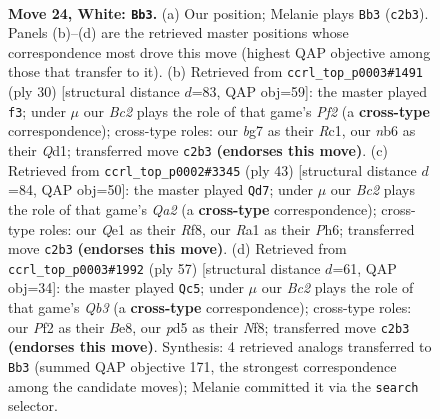\documentclass[11pt]{article}
\begin{document}
\clearpage

\begin{figure}[p]\centering
\begin{subfigure}{0.46\textwidth}\centering
\resizebox{\linewidth}{!}{%
\newchessgame
\chessboard[
  setfen={2r3k1/pp3pb1/1nn2qp1/3p3p/3P4/6BP/PPB2PP1/RN2Q1K1 w - - 1 24},
  showmover=false,
  pgfstyle=straightmove, color=movearrow, markmove={c2-b3}
]}
\caption{}
\end{subfigure}\hfill
\begin{subfigure}{0.46\textwidth}\centering
\resizebox{\linewidth}{!}{%
\newchessgame
\chessboard[
  setfen={r3q1k1/1p3pp1/p1n2n1p/3p1b2/3P1B2/2N3P1/PP3PBP/2RQ2K1 w - - 0 16},
  showmover=false,
  pgfstyle=straightmove, color=movearrow, markmove={f2-f3}
]}
\caption{}
\end{subfigure}
\\[4pt]
\begin{subfigure}{0.46\textwidth}\centering
\resizebox{\linewidth}{!}{%
\newchessgame
\chessboard[
  setfen={1n3rk1/q4pp1/3bp2p/8/1pQP4/1Pp1N1P1/4PPBP/5RK1 b - - 5 22},
  showmover=false,
  pgfstyle=straightmove, color=movearrow, markmove={a7-d7}
]}
\caption{}
\end{subfigure}\hfill
\begin{subfigure}{0.46\textwidth}\centering
\resizebox{\linewidth}{!}{%
\newchessgame
\chessboard[
  setfen={4bnk1/r5p1/1q1bp2p/1p6/2p1B3/2N1PN1P/1PQ2PP1/1R4K1 b - - 1 29},
  showmover=false,
  pgfstyle=straightmove, color=movearrow, markmove={b6-c5}
]}
\caption{}
\end{subfigure}
\caption{\textbf{Move 24, White: \texttt{Bb3}.} (a) Our position; Melanie plays \texttt{Bb3} (\texttt{c2b3}). Panels (b)--(d) are the retrieved master positions whose correspondence most drove this move (highest QAP objective among those that transfer to it). (b) Retrieved from \texttt{ccrl\_top\_p0003\#1491} (ply 30) [structural distance $d$=83, QAP obj=59]: the master played \texttt{f3}; under $\mu$ our \emph{Bc2} plays the role of that game's \emph{Pf2} (a \textbf{cross-type} correspondence); cross-type roles: our \emph{b}g7 as their \emph{R}c1, our \emph{n}b6 as their \emph{Q}d1; transferred move \texttt{c2b3} \textbf{(endorses this move)}. (c) Retrieved from \texttt{ccrl\_top\_p0002\#3345} (ply 43) [structural distance $d$=84, QAP obj=50]: the master played \texttt{Qd7}; under $\mu$ our \emph{Bc2} plays the role of that game's \emph{Qa2} (a \textbf{cross-type} correspondence); cross-type roles: our \emph{Q}e1 as their \emph{R}f8, our \emph{R}a1 as their \emph{P}h6; transferred move \texttt{c2b3} \textbf{(endorses this move)}. (d) Retrieved from \texttt{ccrl\_top\_p0003\#1992} (ply 57) [structural distance $d$=61, QAP obj=34]: the master played \texttt{Qc5}; under $\mu$ our \emph{Bc2} plays the role of that game's \emph{Qb3} (a \textbf{cross-type} correspondence); cross-type roles: our \emph{P}f2 as their \emph{B}e8, our \emph{p}d5 as their \emph{N}f8; transferred move \texttt{c2b3} \textbf{(endorses this move)}. Synthesis: 4 retrieved analogs transferred to \texttt{Bb3} (summed QAP objective 171, the strongest correspondence among the candidate moves); Melanie committed it via the \texttt{search} selector.}
\label{fig:thought-m46}
\end{figure}
\end{document}
